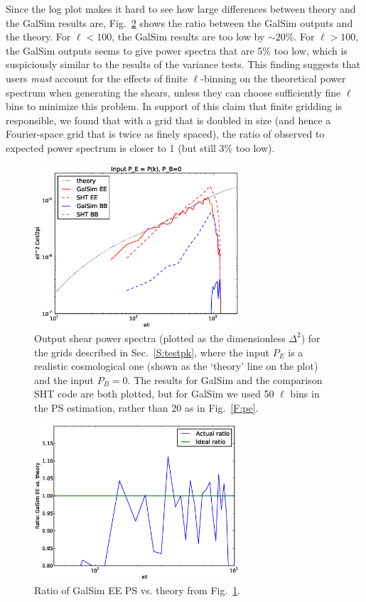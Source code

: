 \documentclass[preprint]{aastex}
\begin{document}
Since the log plot makes it hard to see how large differences between
theory and the GalSim results are, Fig.~\ref{F:pe-fine-ratio} shows
the ratio between the GalSim outputs and the theory.  For $\ell<100$,
the GalSim results are too low by $\sim 20$\%.  For $\ell>100$, the
GalSim outputs seems to give power spectra that are 5\% too low, which
is suspiciously similar to the results of the variance tests.  This
finding suggests that users {\em must} account for the effects of
finite $\ell$-binning on the theoretical power spectrum when
generating the shears, unless they
can choose sufficiently fine $\ell$ bins to minimize
this problem.  In support of this claim that finite gridding is
responsible, we found that with a grid that is doubled in size (and
hence a Fourier-space grid that is twice as finely spaced), the ratio
of observed to expected power spectrum is closer to 1 (but still 3\%
too low).
\begin{figure}
\begin{center}
\includegraphics[width=3in]{../external/test_gridshear/output/compare_input_pe.fine.eps}
\caption{Output shear power spectra (plotted as the dimensionless
  $\Delta^2$) for the grids described in Sec.~\ref{S:testpk}, where
  the input $P_E$ is a realistic cosmological one (shown as the `theory' line on
  the plot) and the input $P_B=0$. The results for GalSim and the
  comparison SHT code are both plotted, but for GalSim we used 50
  $\ell$ bins in the PS estimation, rather than 20 as in Fig.~\ref{F:pe}.\label{F:pe-fine}}
\end{center}
\end{figure}
\begin{figure}
\begin{center}
\includegraphics[width=3in]{../external/test_gridshear/output/compare_input_pe.fine.ratio.eps}
\caption{Ratio of GalSim EE PS vs. theory from Fig.~\ref{F:pe-fine}.\label{F:pe-fine-ratio}}
\end{center}
\end{figure}
\end{document}
